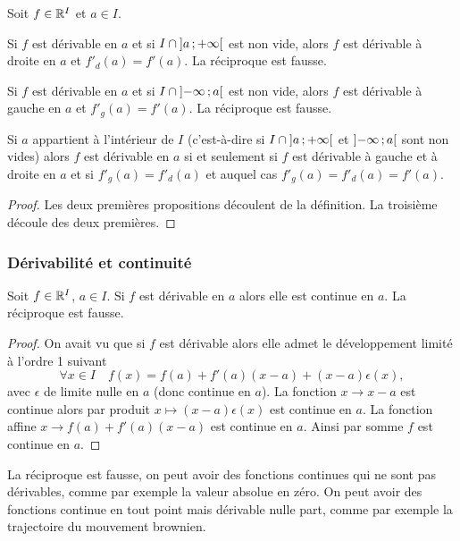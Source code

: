 Soit \(f \in \mathbb{R}^I\) et \(a \in I\).
\begin{prop}
  Si \(f\) est dérivable en \(a\) et si \(I\cap \left] a \, ;  +\infty \right[\) est non vide, alors \(f\) est dérivable à droite en \(a\) et \(f'_d(a)=f'(a)\). La réciproque est fausse.
\end{prop}
\begin{prop}
  Si \(f\) est dérivable en \(a\) et si \(I\cap \left] -\infty \, ;  a \right[\) est non vide, alors \(f\) est dérivable à gauche en \(a\) et \(f'_g(a)=f'(a)\). La réciproque est fausse.
\end{prop}
\begin{prop}
  Si \(a\) appartient à l'intérieur de \(I\) (c'est-à-dire si \(I\cap \left] a \, ;  +\infty \right[\) et \(\left] -\infty \, ;  a \right[\) sont non vides) alors \(f\) est dérivable en \(a\) si et seulement si \(f\) est dérivable à gauche et à droite en \(a\) et si \(f'_g(a) = f'_d(a)\) et auquel cas \(f'_g(a)=f'_d(a)=f'(a)\).
\end{prop}
\begin{proof}
  Les deux premières propositions découlent de la définition. La troisième découle des deux premières.
\end{proof}

\subsubsection{Dérivabilité et continuité}

\begin{prop}
  Soit \(f \in \mathbb{R}^I\), \(a \in I\). Si \(f\) est dérivable en \(a\) alors elle est continue en \(a\). La réciproque est fausse.
\end{prop}
\begin{proof}
  On avait vu que si \(f\) est dérivable alors elle admet le développement limité à l'ordre 1 suivant
  \begin{equation}
    \forall x \in I \quad f(x)=f(a)+f'(a)(x-a)+(x-a)\epsilon(x),
  \end{equation}
  avec \(\epsilon\) de limite nulle en \(a\) (donc continue en \(a\)). La fonction \(x \longrightarrow x-a\) est continue alors par produit \(x \longmapsto (x-a)\epsilon(x)\) est continue en \(a\). La fonction affine \(x \longrightarrow f(a)+f'(a)(x-a)\) est continue en \(a\). Ainsi par somme \(f\) est continue en \(a\).
\end{proof}
La réciproque est fausse, on peut avoir des fonctions continues qui ne sont pas dérivables, comme par exemple la valeur absolue en zéro. On peut avoir des fonctions continue en tout point mais dérivable nulle part, comme par exemple la trajectoire du mouvement brownien.

